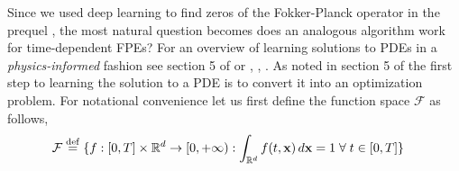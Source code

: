  Since we used deep learning to find zeros of the Fokker-Planck operator in the prequel \cite{mandal2023learning}, the most natural question becomes does an analogous algorithm work for time-dependent FPEs? For an overview of learning solutions to PDEs in a \textit{physics-informed} fashion see section 5 of \cite{mandal2023learning} or \cite{raissi2019physics}, \cite{blechschmidt2021three}, \cite{sirignano2018dgm}. 
As noted in section 5 of \cite{mandal2023learning} the first step to learning the solution to a PDE is to convert it into an optimization problem. For notational convenience let us first define the function space $\mathcal F$ as follows,
\begin{align}
\mathcal F\stackrel{\rm def}{=}\{&f:[0, T]\times\mathbb R^d\to[0, +\infty):\int_{\mathbb R^d}f(t, \mathbf x)\,d\mathbf x=1\;\forall\; t\in[0, T]\}\label{eq:def-fn-space--dynamic-fp}
\end{align}


